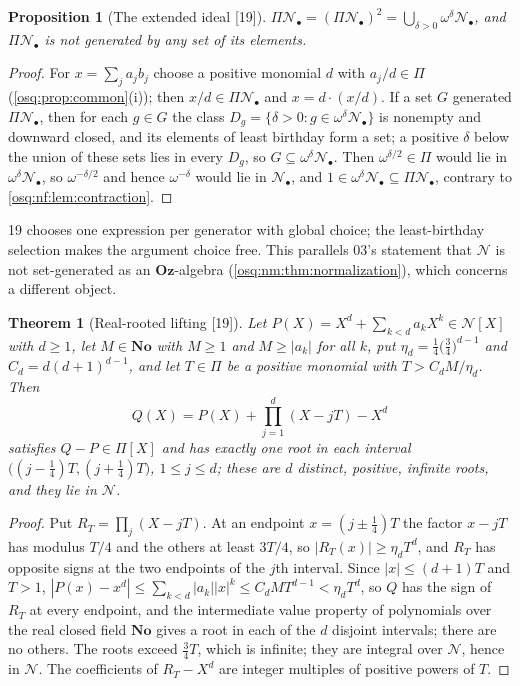 \documentclass[11pt,letterpaper]{article}
\numberwithin{equation}{section}
\newtheorem{theorem}{Theorem}[section]
\newtheorem{proposition}[proposition]{Proposition}
\theoremstyle{definition}
\theoremstyle{remark}
\theoremstyle{plain}
\newcommand{\No}{\mathbf{No}}
\newcommand{\Oz}{\mathbf{Oz}}
\newcommand{\NN}{\mathcal N}         %
\newcommand{\src}[1]{\textup{\textsf{[#1]}}}
\begin{document}
\begin{proposition}[The extended ideal \src{19}]\label{osq:nf:prop:ideal}
$\Pi\NN_\bullet=(\Pi\NN_\bullet)^2=\bigcup_{\delta>0}\omega^\delta\NN_\bullet$, and $\Pi\NN_\bullet$ is not generated by any set of its elements.
\end{proposition}
\begin{proof}
For $x=\sum_ja_jb_j$ choose a positive monomial $d$ with $a_j/d\in\Pi$ (\cref{osq:prop:common}(i)); then $x/d\in\Pi\NN_\bullet$ and $x=d\cdot(x/d)$.
If a set $G$ generated $\Pi\NN_\bullet$, then for each $g\in G$ the class $D_g=\{\delta>0:g\in\omega^\delta\NN_\bullet\}$ is nonempty and
downward closed, and its elements of least birthday form a set; a positive $\delta$ below the union of these sets lies in every $D_g$, so
$G\subseteq\omega^\delta\NN_\bullet$. Then $\omega^{\delta/2}\in\Pi$ would lie in $\omega^\delta\NN_\bullet$, so $\omega^{-\delta/2}$ and hence
$\omega^{-\delta}$ would lie in $\NN_\bullet$, and $1\in\omega^\delta\NN_\bullet\subseteq\Pi\NN_\bullet$, contrary to \cref{osq:nf:lem:contraction}.
\end{proof}

19 chooses one expression per generator with global choice; the least-birthday selection makes the argument choice free. This parallels
03's statement that $\NN$ is not set-generated as an $\Oz$-algebra (\cref{osq:nm:thm:normalization}), which concerns a different object.

\begin{theorem}[Real-rooted lifting \src{19}]\label{osq:nf:thm:rootlift}
Let $P(X)=X^d+\sum_{k<d}a_kX^k\in\NN[X]$ with $d\ge1$, let $M\in\No$ with $M\ge1$ and $M\ge|a_k|$ for all $k$, put
$\eta_d=\frac14\bigl(\frac34\bigr)^{d-1}$ and $C_d=d(d+1)^{d-1}$, and let $T\in\Pi$ be a positive monomial with $T>C_dM/\eta_d$. Then
\[
 Q(X)=P(X)+\prod_{j=1}^d(X-jT)-X^d
\]
satisfies $Q-P\in\Pi[X]$ and has exactly one root in each interval $\bigl((j-\frac14)T,(j+\frac14)T\bigr)$, $1\le j\le d$; these are $d$ distinct,
positive, infinite roots, and they lie in $\NN$.
\end{theorem}
\begin{proof}
Put $R_T=\prod_j(X-jT)$. At an endpoint $x=(j\pm\frac14)T$ the factor $x-jT$ has modulus $T/4$ and the others at least $3T/4$, so
$|R_T(x)|\ge\eta_dT^d$, and $R_T$ has opposite signs at the two endpoints of the $j$th interval. Since $|x|\le(d+1)T$ and $T>1$,
$|P(x)-x^d|\le\sum_{k<d}|a_k||x|^k\le C_dMT^{d-1}<\eta_dT^d$, so $Q$ has the sign of $R_T$ at every endpoint, and the intermediate value
property of polynomials over the real closed field $\No$ gives a root in each of the $d$ disjoint intervals; there are no others. The
roots exceed $\frac34T$, which is infinite; they are integral over $\NN$, hence in $\NN$. The coefficients of $R_T-X^d$ are integer
multiples of positive powers of $T$.
\end{proof}
\end{document}
